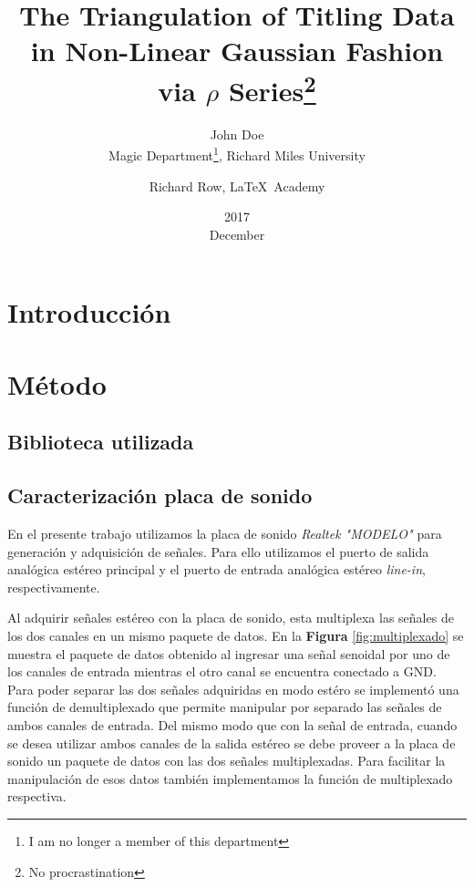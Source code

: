 \documentclass[a4paper,11pt]{article}
\title{The Triangulation of Titling Data in Non-Linear Gaussian Fashion via $\rho$ Series\thanks{No procrastination}}
\date{2017\\ December}
\author{John Doe\\ Magic Department\thanks{I am no longer a member of this department}, Richard Miles University 
\and Richard Row, \LaTeX\ Academy}
\begin{document}
\maketitle

\section{Introducción}
\clearpage

\section{Método}

	\subsection{Biblioteca utilizada}
    \clearpage
	
	\subsection{Caracterización placa de sonido}

En el presente trabajo utilizamos la placa de sonido \emph{Realtek
"MODELO"} para generación y adquisición de señales.  Para ello
utilizamos el puerto de salida analógica estéreo principal y el puerto
de entrada analógica estéreo \emph{line-in}, respectivamente.

Al adquirir señales estéreo con la placa de sonido, esta multiplexa las
señales de los dos canales en un mismo paquete de datos. En la
\textbf{Figura} \ref{fig:multiplexado} se muestra el paquete de datos
obtenido al ingresar una señal senoidal por uno de los canales de
entrada mientras el otro canal se encuentra conectado a
GND.
Para poder separar las dos señales adquiridas en modo estéro se
implementó una función de demultiplexado que permite manipular por
separado las señales de ambos canales de entrada.  Del mismo modo que
con la señal de entrada, cuando se desea utilizar ambos canales de la
salida estéreo se debe proveer a la placa de sonido un paquete de datos
con las dos señales multiplexadas. Para facilitar la manipulación de esos
datos también implementamos la función de multiplexado respectiva.
\end{document}
